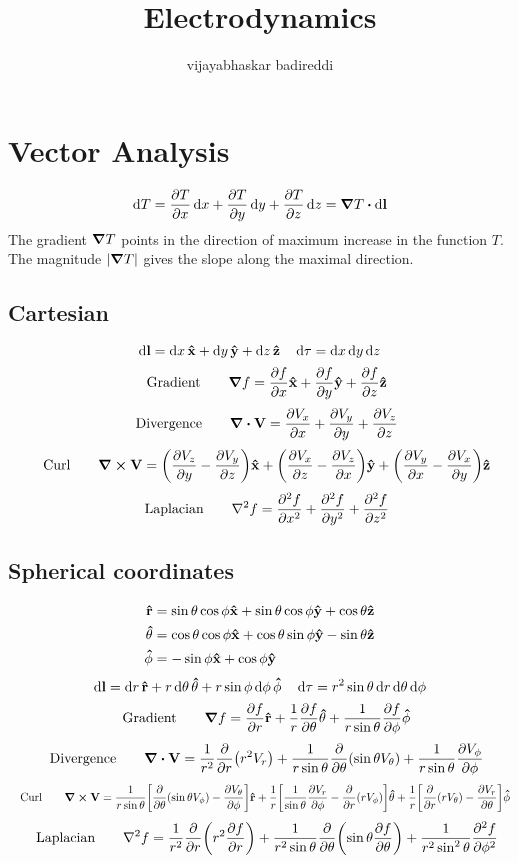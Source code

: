 \documentclass[12pt]{article}
\title{Electrodynamics}
\author{vijayabhaskar badireddi}
\begin{document}

\section{Vector Analysis}

\[\dd{T}=\pdv{T}{x}\dd{x}+\pdv{T}{y}\dd{y}+\pdv{T}{z}\dd{z}=\grad{T}\vdot\dd{\vb{l}}\]
The gradient $\grad{T}$ points in the direction of  maximum increase in the function $T$. The magnitude $|\grad{T}|$ gives the slope along the maximal direction.

\subsection*{Cartesian}
\[\dd{\vb{l}}=\dd{x}\vu{\vb{x}}+\dd{y}\vu{\vb{y}}+\dd{z}\vu{\vb{z}}\quad\dd{\tau}=\dd{x}\dd{y}\dd{z}\]
\[\qq{Gradient}\quad\grad{f}=\pdv{f}{x}\vu{\vb{x}}+\pdv{f}{y}\vu{\vb{y}}+\pdv{f}{z}\vu{\vb{z}}\]
\[\qq{Divergence}\quad\div{\vb{V}}=\pdv{V_x}{x}+\pdv{V_y}{y}+\pdv{V_z}{z}\]
\[\qq{Curl}\quad\curl{\vb{V}}=\qty(\pdv{V_z}{y}-\pdv{V_y}{z})\vu{\vb{x}}+\qty(\pdv{V_x}{z}-\pdv{V_z}{x})\vu{\vb{y}}+\qty(\pdv{V_y}{x}-\pdv{V_x}{y})\vu{\vb{z}}\]
\[\qq{Laplacian}\quad\laplacian{f}=\pdv[2]{f}{x}+\pdv[2]{f}{y}+\pdv[2]{f}{z}\]

\subsection*{Spherical coordinates}
\begin{align*}
\vu{r}&=\sin\theta\cos\phi\vu{x}+\sin\theta\cos\phi\vu{y}+\cos\theta\vu{z}\\
\vu{\theta}&=\cos\theta\cos\phi\vu{x}+\cos\theta\sin\phi\vu{y}-\sin\theta\vu{z}\\
\vu{\phi}&=-\sin\phi\vu{x}+\cos\phi\vu{y}
\end{align*}
\[\dd{\vb{l}}=\dd{r}\vu{\vb{r}}+r\dd{\theta}\vu{\vb{\theta}}+r\sin\phi\dd{\phi}\vu{\vb{\phi}}\quad\dd{\tau}=r^2\sin\theta\dd{r}\dd{\theta}\dd{\phi}\]
\[\qq{Gradient}\quad\grad{f}=\pdv{f}{r}\vu{\vb{r}}+\frac{1}{r}\pdv{f}{\theta}\vu{\vb{\theta}}+\frac{1}{r\sin\theta}\pdv{f}{\phi}\vu{\vb{\phi}}\]
\[\qq{Divergence}\quad\div{\vb{V}}=\frac{1}{r^2}\pdv{r}\qty(r^2V_r)+\frac{1}{r\sin\theta}\pdv{\theta}\qty(\sin{\theta}V_{\theta})+\frac{1}{r\sin\theta}\pdv{V_{\phi}}{\phi}\]
\[\qq{Curl}\quad\curl{\vb{V}}=\frac{1}{r\sin\theta}\bqty{\pdv{\theta}\qty(\sin{\theta}V_{\phi})-\pdv{V_{\theta}}{\phi}}\vu{\vb{r}}+\frac{1}{r}\bqty{\frac{1}{\sin\theta}\pdv{V_r}{\phi}-\pdv{r}\qty(rV_{\phi})}\vu{\vb{\theta}}+\frac{1}{r}\bqty{\pdv{r}\qty(rV_{\theta})-\pdv{V_r}{\theta}}\vu{\vb{\phi}}\]
\[\qq{Laplacian}\quad\laplacian{f}=\frac{1}{r^2}\pdv{r}\qty(r^2\pdv{f}{r})+\frac{1}{r^2\sin\theta}\pdv{\theta}\qty(\sin{\theta}\pdv{f}{\theta})+\frac{1}{r^2\sin^2{\theta}}\pdv[2]{f}{\phi}\]
\end{document}
